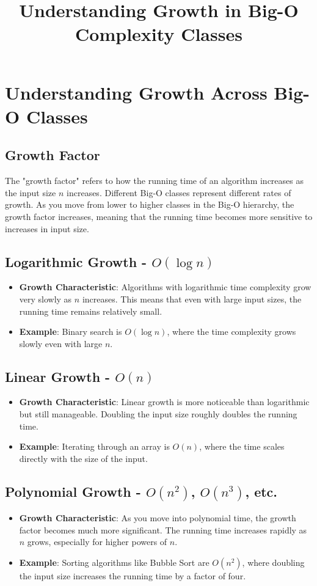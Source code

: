 \documentclass{article}
\title{Understanding Growth in Big-O Complexity Classes}
\author{}
\date{}
\begin{document}
\maketitle

\section{Understanding Growth Across Big-O Classes}

\subsection{Growth Factor}
The "growth factor" refers to how the running time of an algorithm increases as the input size \( n \) increases. Different Big-O classes represent different rates of growth. As you move from lower to higher classes in the Big-O hierarchy, the growth factor increases, meaning that the running time becomes more sensitive to increases in input size.

\subsection{Logarithmic Growth - \( O(\log n) \)}
\begin{itemize}
    \item \textbf{Growth Characteristic}: Algorithms with logarithmic time complexity grow very slowly as \( n \) increases. This means that even with large input sizes, the running time remains relatively small.
    \item \textbf{Example}: Binary search is \( O(\log n) \), where the time complexity grows slowly even with large \( n \).
\end{itemize}

\subsection{Linear Growth - \( O(n) \)}
\begin{itemize}
    \item \textbf{Growth Characteristic}: Linear growth is more noticeable than logarithmic but still manageable. Doubling the input size roughly doubles the running time.
    \item \textbf{Example}: Iterating through an array is \( O(n) \), where the time scales directly with the size of the input.
\end{itemize}

\subsection{Polynomial Growth - \( O(n^2) \), \( O(n^3) \), etc.}
\begin{itemize}
    \item \textbf{Growth Characteristic}: As you move into polynomial time, the growth factor becomes much more significant. The running time increases rapidly as \( n \) grows, especially for higher powers of \( n \).
    \item \textbf{Example}: Sorting algorithms like Bubble Sort are \( O(n^2) \), where doubling the input size increases the running time by a factor of four.
\end{itemize}
\end{document}

